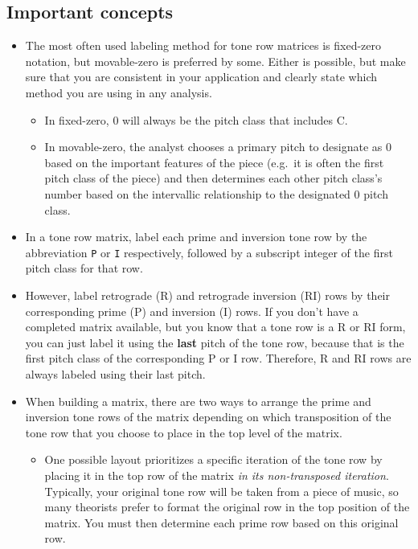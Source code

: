 \documentclass{book}
\providecommand{\tightlist}{%
  \setlength{\itemsep}{0pt}\setlength{\parskip}{0pt}}
\begin{document}
\hypertarget{important-concepts-1}{%
\subsection{Important concepts}\label{important-concepts-1}}

\begin{itemize}
\tightlist
\item
  The most often used labeling method for tone row matrices is fixed-zero
  notation, but movable-zero is preferred by some. Either is possible, but
  make sure that you are consistent in your application and clearly state
  which method you are using in any analysis.

  \begin{itemize}
  \tightlist
  \item
    In fixed-zero, 0 will always be the pitch class that includes C.
  \item
    In movable-zero, the analyst chooses a primary pitch to designate as 0
    based on the important features of the piece (e.g.~it is often the first
    pitch class of the piece) and then determines each other pitch class's
    number based on the intervallic relationship to the designated 0 pitch
    class.
  \end{itemize}
\item
  In a tone row matrix, label each prime and inversion tone row by the
  abbreviation \texttt{P} or \texttt{I} respectively, followed by a subscript
  integer of the first pitch class for that row.
\item
  However, label retrograde (R) and retrograde inversion (RI) rows by their
  corresponding prime (P) and inversion (I) rows. If you don't have a
  completed matrix available, but you know that a tone row is a R or RI form,
  you can just label it using the \textbf{last} pitch of the tone row, because
  that is the first pitch class of the corresponding P or I row. Therefore, R
  and RI rows are always labeled using their last pitch.
\item
  When building a matrix, there are two ways to arrange the prime and
  inversion tone rows of the matrix depending on which transposition of the
  tone row that you choose to place in the top level of the matrix.

  \begin{itemize}
  \tightlist
  \item
    One possible layout prioritizes a specific iteration of the tone row by
    placing it in the top row of the matrix \emph{in its non-transposed
    iteration}. Typically, your original tone row will be taken from a piece
    of music, so many theorists prefer to format the original row in the top
    position of the matrix. You must then determine each prime row based on
    this original row.


\end{itemize}
\end{itemize}
\end{document}
